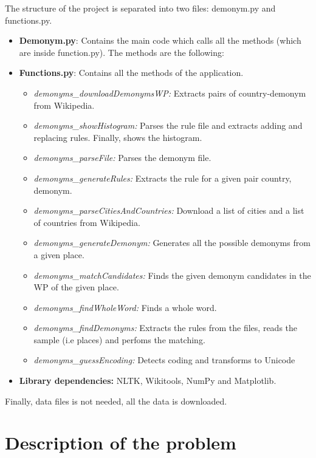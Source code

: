 \documentclass[]{article}
\begin{document}
The structure of the project is separated into two files: demonym.py and functions.py.
\begin{itemize}
\item \textbf{Demonym.py}: Contains the main code which calls all the methods (which are inside function.py). The methods are the following:

\item \textbf{Functions.py}:  Contains all the methods of the application.
\begin{itemize}
\item  \textit{demonyms\_downloadDemonymsWP:} Extracts pairs of country-demonym from Wikipedia.
\item  \textit{demonyms\_showHistogram:} Parses the rule file and extracts adding and replacing rules. Finally, shows the histogram.
\item  \textit{demonyms\_parseFile:} Parses the demonym file.
\item  \textit{demonyms\_generateRules:} Extracts the rule for a given pair country, demonym.
\item  \textit{demonyms\_parseCitiesAndCountries:} Download a list of cities  and a list of countries from Wikipedia.
\item  \textit{demonyms\_generateDemonym:} Generates all the possible demonyms from a given place.
\item  \textit{demonyms\_matchCandidates:} Finds the given demonym candidates in the WP of the given place.
\item  \textit{demonyms\_findWholeWord:} Finds a whole word.
\item  \textit{demonyms\_findDemonyms:} Extracts the rules from the files, reads the sample (i.e places) and perfoms the matching.
\item  \textit{demonyms\_guessEncoding:} Detects coding and transforms to Unicode
\end{itemize}
\item \textbf{Library dependencies:} NLTK, Wikitools, NumPy and Matplotlib.

\end{itemize}



Finally, data files is not needed, all the data is downloaded.

\section{Description of the problem}
\end{document}

